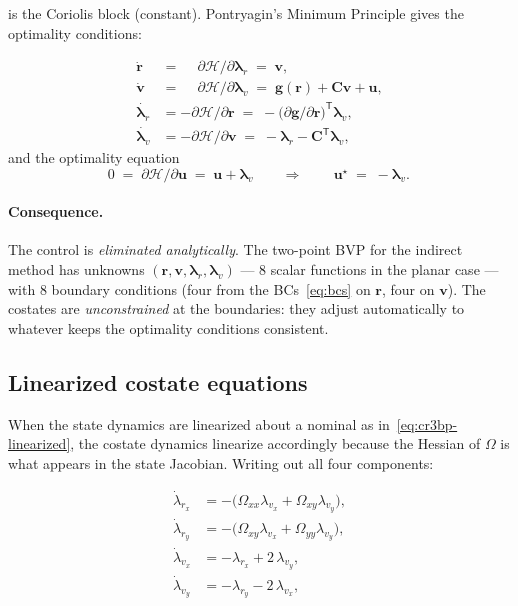 \documentclass[8pt,a4paper]{article}
\newcommand{\bvec}[1]{\bm{#1}}
\newcommand{\uvec}{\bvec{u}}
\newcommand{\lamr}{\bvec{\lambda}_r}
\newcommand{\lamv}{\bvec{\lambda}_v}
\newcommand{\Omegaxx}{\Omega_{xx}}
\newcommand{\Omegayy}{\Omega_{yy}}
\newcommand{\Omegaxy}{\Omega_{xy}}
\newcommand{\TT}{^{\mathsf{T}}}
\theoremstyle{definition}
\theoremstyle{remark}
\begin{document}
is the Coriolis block (constant). Pontryagin's Minimum Principle
gives the optimality conditions:

\begin{align}
  \dot{\bvec{r}} &=\phantom{-} \partial \mathcal{H} / \partial \lamr
              \;=\; \bvec{v}, \\
  \dot{\bvec{v}} &=\phantom{-} \partial \mathcal{H} / \partial \lamv
              \;=\; \bvec{g}(\bvec{r}) + \bvec{C} \bvec{v} + \uvec, \\
  \dot{\lamr}    &=          - \partial \mathcal{H} / \partial \bvec{r}
              \;=\; - \Big(\partial \bvec{g}/\partial \bvec{r}\Big)\TT \lamv, \\
  \dot{\lamv}    &=          - \partial \mathcal{H} / \partial \bvec{v}
              \;=\; - \lamr - \bvec{C}\TT \lamv,
\end{align}
and the optimality equation
\begin{equation}
  0 \;=\; \partial \mathcal{H}/\partial \uvec
    \;=\; \uvec + \lamv
  \qquad\Longrightarrow\qquad
  \boxed{\,\uvec^\star \;=\; -\lamv.\,}
\end{equation}

\paragraph{Consequence.}
The control is \emph{eliminated analytically}. The two-point BVP for
the indirect method has unknowns $(\bvec{r}, \bvec{v}, \lamr, \lamv)$
--- $8$ scalar functions in the planar case --- with $8$ boundary
conditions (four from the BCs~\eqref{eq:bcs} on $\bvec{r}$, four on
$\bvec{v}$). The costates are \emph{unconstrained} at the boundaries:
they adjust automatically to whatever keeps the optimality conditions
consistent.

\subsection{Linearized costate equations}

When the state dynamics are linearized about a nominal as
in~\eqref{eq:cr3bp-linearized}, the costate dynamics linearize
accordingly because the Hessian of $\Omega$ is what appears in the
state Jacobian. Writing out all four components:

\begin{align}
  \dot\lambda_{r_x} &= -\big(\Omegaxx \lambda_{v_x}
                           + \Omegaxy \lambda_{v_y}\big), \\
  \dot\lambda_{r_y} &= -\big(\Omegaxy \lambda_{v_x}
                           + \Omegayy \lambda_{v_y}\big), \\
  \dot\lambda_{v_x} &= -\lambda_{r_x} + 2\,\lambda_{v_y}, \\
  \dot\lambda_{v_y} &= -\lambda_{r_y} - 2\,\lambda_{v_x},
\end{align}
\end{document}
